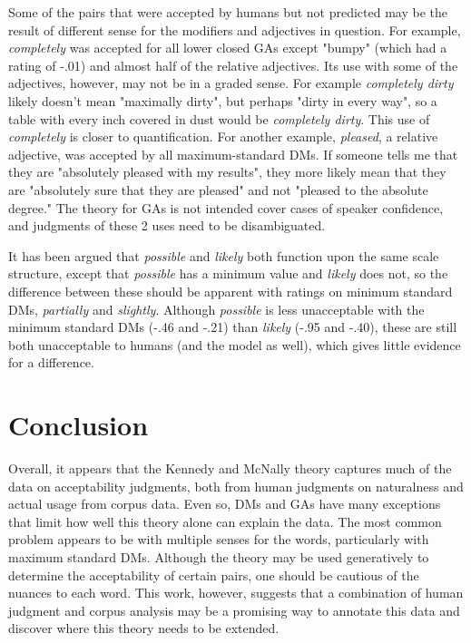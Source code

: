 \documentclass[11pt]{article}
\begin{document}
Some of the pairs that were accepted by humans but not predicted may be the result of different sense for the modifiers and adjectives in question. For example, \textit{completely} was accepted for all lower closed GAs except "bumpy" (which had a rating of -.01) and almost half of the relative adjectives. Its use with some of the adjectives, however, may not be in a graded sense. For example \textit{completely dirty} likely doesn't mean "maximally dirty", but perhaps "dirty in every way", so a table with every inch covered in dust would be \textit{completely dirty}. This use of \textit{completely} is closer to quantification. For another example, \textit{pleased}, a relative adjective, was accepted by all maximum-standard DMs. If someone tells me that they are "absolutely pleased with my results", they more likely mean that they are "absolutely sure that they are pleased" and not "pleased to the absolute degree." The theory for GAs is not intended cover cases of speaker confidence, and judgments of these 2 uses need to be disambiguated.

It has been argued that \textit{possible} and \textit{likely} both function upon the same scale structure, except that \textit{possible} has a minimum value and \textit{likely} does not, so the difference between these should be apparent with ratings on minimum standard DMs, \textit{partially} and \textit{slightly}. Although \textit{possible} is less unacceptable with the minimum standard DMs (-.46 and -.21) than \textit{likely} (-.95 and -.40), these are still both unacceptable to humans (and the model as well), which gives little evidence for a difference.

\section{Conclusion}

Overall, it appears that the Kennedy and McNally theory captures much of the data on acceptability judgments, both from human judgments on naturalness and actual usage from corpus data. Even so, DMs and GAs have many exceptions that limit how well this theory alone can explain the data. The most common problem appears to be with multiple senses for the words, particularly with maximum standard DMs. Although the theory may be used generatively to determine the acceptability of certain pairs, one should be cautious of the nuances to each word. This work, however, suggests that a combination of human judgment and corpus analysis may be a promising way to annotate this data and discover where this theory needs to be extended.
\end{document}
